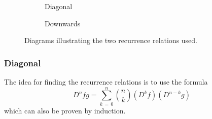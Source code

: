 \documentclass[12pt]{article}
\begin{document}
\begin{figure}[htbp]
  \centering
  \begin{subfigure}{.25\linewidth}
    \centering
    \caption{Diagonal}
    \label{fig:recurrence-diag}
  \end{subfigure}
  \begin{subfigure}{.25\linewidth}
    \centering
    \caption{Downwards}
    \label{fig:recurrence-down}
  \end{subfigure}
  \caption{Diagrams illustrating the two recurrence relations used.}
  \label{fig:individual-recurrence-relations}
\end{figure}

\subsubsection{Diagonal}

The idea for finding the recurrence relations is to use the formula
\begin{equation}
  D^{n}fg = \sum_{k\,=\,0}^{n}{n\choose k}(D^kf)(D^{n-k}g)
\end{equation}
which can also be proven by induction.
\end{document}

